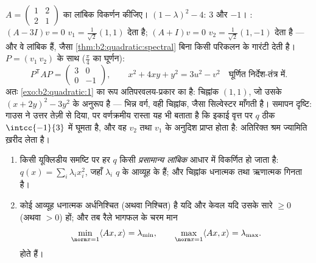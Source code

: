 \begin{example}[एक पूरा वर्णक्रमीय अभ्यास]\label{ex:b2:quadratic:fullrun}
$A = \begin{pmatrix} 1 & 2\\ 2 &
1\end{pmatrix}$ का लांबिक विकर्णन कीजिए।  $(1 - \lambda)^2 -
4$:  $3$ और
$-1$। : $(A - 3I)v = 0$ $v_1 = \frac{1}{\sqrt2}(1,1)$ देता है; $(A + I)v = 0$ $v_2
= \frac{1}{\sqrt2}(1,-1)$ देता है --- और वे लांबिक
हैं, जैसा \cref{thm:b2:quadratic:spectral} बिना किसी परिकलन के गारंटी देती है। $P = (v_1\ v_2)$ के साथ ($\frac\pi4$ का
घूर्णन):
\[
P^{\mathsf T}AP = \begin{pmatrix} 3 & 0\\ 0 & -1
\end{pmatrix},
\qquad
x^2 + 4xy + y^2 = 3u^2 - v^2
\quad\text{घूर्णित निर्देश-तंत्र में} .
\]
अतः \cref{exo:b2:quadratic:1} का रूप अतिपरवलय-प्रकार का है: चिह्नांक $(1,1)$, जो उसके  $(x + 2y)^2 - 3y^2$ के अनुरूप है --- भिन्न वर्ग, वही चिह्नांक, जैसा सिल्वेस्टर
माँगती है। समापन दृष्टि: गाउस ने उत्तर तेज़ी से दिया, पर वर्णक्रमीय
रास्ता यह भी बताता है कि इकाई वृत्त पर $q$ ठीक $\intcc{-1}{3}$ में घूमता है, और वह
$v_2$ तथा $v_1$ के अनुदिश प्राप्त होता है: अतिरिक्त श्रम ज्यामिति ख़रीद
लेता है।
\end{example}

\begin{corollary}[मुख्य अक्ष; धनात्मकता की जाँचें]\label{cor:b2:quadratic:principalaxes}
\begin{enumerate}
  \item किसी यूक्लिडीय समष्टि पर हर  $q$ किसी \emph{प्रसामान्य
        लांबिक} आधार में विकर्णित हो जाता है: $q(x) = \sum_i \lambda_i
        x_i^2$, जहाँ $\lambda_i$ $q$ के 
        आव्यूह के  हैं; और चिह्नांक धनात्मक तथा ऋणात्मक
         गिनता है।
  \item कोई  आव्यूह धनात्मक अर्धनिश्चित (अथवा निश्चित) है यदि और
        केवल यदि उसके सारे  $\geq 0$ (अथवा $>
        0$) हों; और तब रैले
        भागफल के चरम मान
        \[
        \min_{\norm x = 1} \langle Ax, x\rangle = \lambda_{\min},
        \qquad
        \max_{\norm x = 1} \langle Ax, x\rangle = \lambda_{\max} .
        \]
        होते हैं।
\end{enumerate}
\end{corollary}

